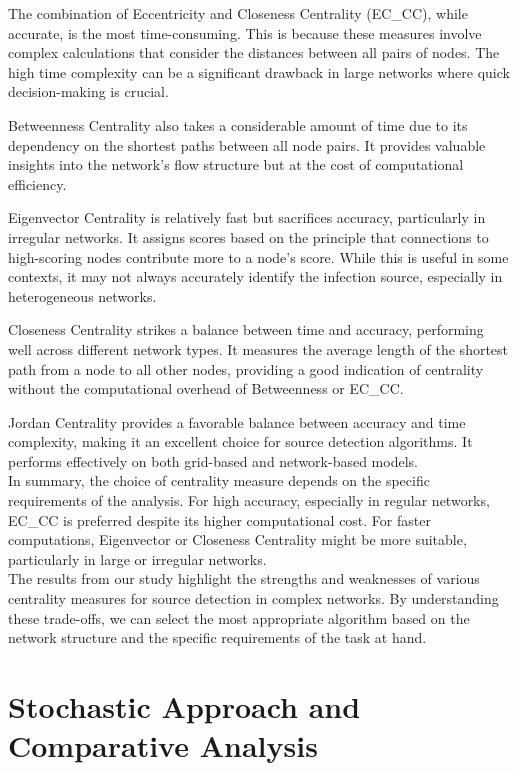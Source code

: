 The combination of Eccentricity and Closeness Centrality (EC\_CC), while accurate, is the most time-consuming. This is because these measures involve complex calculations that consider the distances between all pairs of nodes. The high time complexity can be a significant drawback in large networks where quick decision-making is crucial.

Betweenness Centrality also takes a considerable amount of time due to its dependency on the shortest paths between all node pairs. It provides valuable insights into the network's flow structure but at the cost of computational efficiency.

Eigenvector Centrality is relatively fast but sacrifices accuracy, particularly in irregular networks. It assigns scores based on the principle that connections to high-scoring nodes contribute more to a node's score. While this is useful in some contexts, it may not always accurately identify the infection source, especially in heterogeneous networks.

Closeness Centrality strikes a balance between time and accuracy, performing well across different network types. It measures the average length of the shortest path from a node to all other nodes, providing a good indication of centrality without the computational overhead of Betweenness or EC\_CC.

Jordan Centrality provides a favorable balance between accuracy and time complexity, making it an excellent choice for source detection algorithms. It performs effectively on both grid-based and network-based models.\\

In summary, the choice of centrality measure depends on the specific requirements of the analysis. For high accuracy, especially in regular networks, EC\_CC is preferred despite its higher computational cost. For faster computations, Eigenvector or Closeness Centrality might be more suitable, particularly in large or irregular networks.\\

The results from our study highlight the strengths and weaknesses of various centrality measures for source detection in complex networks. By understanding these trade-offs, we can select the most appropriate algorithm based on the network structure and the specific requirements of the task at hand.

\section{Stochastic Approach and Comparative Analysis}

